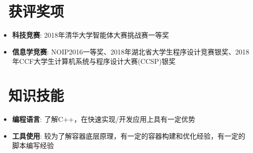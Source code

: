 \documentclass[utf8,letterpaper,11pt]{ctexart}
\newcommand{\resumeItem}[2]{
  \item\small{
    \textbf{#1}{: #2 \vspace{-2pt}}
  }
}
\newcommand{\resumeSubItem}[2]{\resumeItem{#1}{#2}\vspace{-4pt}}
\newcommand{\resumeSubHeadingListStart}{\begin{itemize}[leftmargin=*]}
\newcommand{\resumeSubHeadingListEnd}{\end{itemize}}
\begin{document}
\section{\faAward \ 获评奖项}
  \resumeSubHeadingListStart
    \resumeSubItem{科技竞赛}
    {2018年清华大学智能体大赛挑战赛一等奖}
    \resumeSubItem{信息学竞赛}
      {NOIP2016一等奖、2018年湖北省大学生程序设计竞赛银奖、2018年CCF大学生计算机系统与程序设计大赛(CCSP)银奖}
  \resumeSubHeadingListEnd
\vspace{1pt}
\section{\faCog \ 知识技能}
  \resumeSubHeadingListStart
    \resumeSubItem{编程语言}
    {了解C++，在快速实现/开发应用上具有一定优势}
    \resumeSubItem{工具使用}
    {较为了解容器底层原理，有一定的容器构建和优化经验，有一定的脚本编写经验}
  \resumeSubHeadingListEnd
\end{document}
